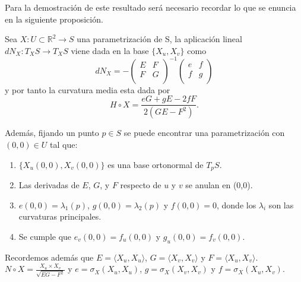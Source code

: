 	${ }$\\
	
	Para la demostración de este resultado será necesario recordar lo que se enuncia en la siguiente proposición.
	${ }$\\
	
	\begin{proposicion}
		Sea $X : U \subset \mathbb{R}^2 \to S$ una parametrización de S, la aplicación lineal $dN_X : T_X S \to T_X S$ viene dada en la base $\{X_u, X_v \}$ como
		\[
			dN_X = - \left( {\begin{array}{cc}
						E & F \\
						F & G \\
					\end{array} } \right)^{-1}
					\left( {\begin{array}{cc}
						e & f \\
						f & g \\
					\end{array} } \right)
		\]
		y por tanto la curvatura media esta dada por
		\[
			H \circ X = \frac{eG + gE -2fF}{2(GE-F^2)}.
		\]
		
		Además, fijando un punto $p \in S$ se puede encontrar una parametrización con $(0,0) \in U$ tal que:
		\begin{enumerate}
			\item $\{X_u(0,0), X_v(0,0) \}$ es una base ortonormal de $T_p S$.
			\item Las derivadas de $E$, $G$, y $F$ respecto de $u$ y $v$ se anulan en (0,0).
			\item $e(0,0) = \lambda_{1}(p)$, $g(0,0) = \lambda_{2}(p)$ y $f(0,0) = 0$, donde los $\lambda_i$ son las curvaturas principales.
			\item Se cumple que $e_v(0,0) = f_u(0,0)$ y $g_u(0,0) = f_v(0,0)$.
		\end{enumerate}
		
		Recordemos además que $E = \langle X_u, X_u \rangle$, $G = \langle X_v, X_v \rangle$ y $F = \langle X_u, X_v \rangle$. $N \circ X = \frac{X_u \times X_v}{\sqrt{EG-F^2}}$ y $e = \sigma_X(X_u, X_u)$, $g = \sigma_X(X_v, X_v)$ y $f = \sigma_X(X_u, X_v)$.
	\end{proposicion}
	${ }$
